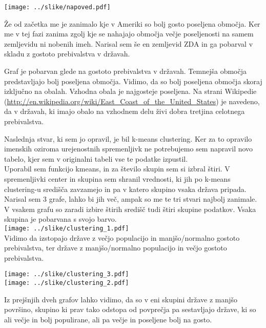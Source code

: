 \documentclass[11pt,a4paper]{article}
\begin{document}
\texttt{[image: ../slike/napoved.pdf]}

Že od začetka me je zanimalo kje v Ameriki so bolj gosto poseljena območja. Ker me v tej fazi zanima zgolj kje se nahajajo območja večje poseljenosti na samem zemljevidu ni nobenih imeh. Narisal sem še en zemljevid ZDA in ga pobarval v skladu z gostoto prebivalstva v državah. \pagebreak


Graf je pobarvan glede na gostoto prebivalstva v državah. Temnejša območja predstavljajo bolj poseljena območja. Vidimo, da so bolj poseljena območja skoraj izključno na obalah. Vzhodna obala je najgosteje poseljena. Na strani Wikipedie (\url{http://en.wikipedia.org/wiki/East_Coast_of_the_United_States}) je navedeno, da v državah, ki imajo obalo na vzhodnem delu živi dobra tretjina celotnega prebivalstva.\pagebreak

Naslednja stvar, ki sem jo opravil, je bil k-means clustering. Ker za to opravilo imenskih oziroma urejenostnih spremenljivk ne potrebujemo sem napravil novo tabelo, kjer sem v originalni tabeli vse te podatke izpustil.\\
Uporabil sem funkcijo kmeans, in za število skupin sem si izbral štiri.
V spremenljivki center in skupina sem shranil vrednosti, ki jih po k-means clustering-u središča zavzamejo in pa v katero skupino vsaka država pripada.\\

Narisal sem 3 grafe, lahko bi jih več, ampak so me te tri stvari najbolj zanimale. V vsakem grafu so zaradi izbire štirih središč tudi štiri skupine podatkov. Vsaka skupina je pobarvana s svojo barvo.\\

\texttt{[image: ../slike/clustering\_1.pdf]}\\

Vidimo da izstopajo države z večjo populacijo in manjšo/normalno gostoto prebivalstva, ter države z manjšo/normalno populacijo in večjo gostoto prebivalstva.

\texttt{[image: ../slike/clustering\_3.pdf]}\\

\texttt{[image: ../slike/clustering\_2.pdf]}
\pagebreak

Iz prejšnjih dveh grafov lahko vidimo, da so v eni skupini države z manjšo površino, skupino ki prav tako odstopa od povprečja pa sestavljajo države, ki so ali večje in bolj populirane, ali pa večje in poseljene bolj na gosto. \\
\end{document}
